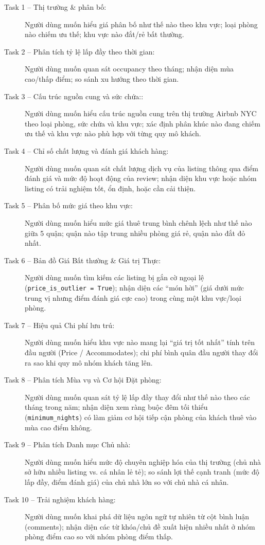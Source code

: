 \begin{description}
    \item[Task 1 -- Thị trường \& phân bố:] Người dùng muốn hiểu giá phân bố như thế nào theo khu vực; loại phòng nào chiếm ưu thế; khu vực nào đắt/rẻ bất thường.

    \item[Task 2 -- Phân tích tỷ lệ lấp đầy theo thời gian:] Người dùng muốn quan sát occupancy theo tháng; nhận diện mùa cao/thấp điểm; so sánh xu hướng theo thời gian.

    \item[Task 3 -- Cấu trúc nguồn cung và sức chứa::] Người dùng muốn hiểu cấu trúc nguồn cung trên thị trường Airbnb NYC theo loại phòng, sức chứa và khu vực; xác định phân khúc nào đang chiếm ưu thế và khu vực nào phù hợp với từng quy mô khách.

    \item[Task 4 -- Chỉ số chất lượng và đánh giá khách hàng:] Người dùng muốn quan sát chất lượng dịch vụ của listing thông qua điểm đánh giá và mức độ hoạt động của review; nhận diện khu vực hoặc nhóm listing có trải nghiệm tốt, ổn định, hoặc cần cải thiện.

    \item[Task 5 -- Phân bố mức giá theo khu vực:] Người dùng muốn hiểu mức giá thuê trung bình chênh lệch như thế nào giữa 5 quận; quận nào tập trung nhiều phòng giá rẻ, quận nào đắt đỏ nhất.

    \item[Task 6 -- Bản đồ Giá Bất thường \& Giá trị Thực:] Người dùng muốn tìm kiếm các listing bị gắn cờ ngoại lệ (\texttt{price\_is\_outlier = True}); nhận diện các ``món hời'' (giá dưới mức trung vị nhưng điểm đánh giá cực cao) trong cùng một khu vực/loại phòng.

    \item[Task 7 -- Hiệu quả Chi phí lưu trú:] Người dùng muốn hiểu khu vực nào mang lại ``giá trị tốt nhất'' tính trên đầu người (Price / Accommodates); chi phí bình quân đầu người thay đổi ra sao khi quy mô nhóm khách tăng lên.

    \item[Task 8 -- Phân tích Mùa vụ và Cơ hội Đặt phòng:] Người dùng muốn quan sát tỷ lệ lấp đầy thay đổi như thế nào theo các tháng trong năm; nhận diện xem ràng buộc đêm tối thiểu (\texttt{minimum\_nights}) có làm giảm cơ hội tiếp cận phòng của khách thuê vào mùa cao điểm không.

    \item[Task 9 -- Phân tích Danh mục Chủ nhà:] Người dùng muốn hiểu mức độ chuyên nghiệp hóa của thị trường (chủ nhà sở hữu nhiều listing vs. cá nhân lẻ tẻ); so sánh lợi thế cạnh tranh (mức độ lấp đầy, điểm đánh giá) của chủ nhà lớn so với chủ nhà cá nhân.

    \item[Task 10 -- Trải nghiệm khách hàng:] Người dùng muốn khai phá dữ liệu ngôn ngữ tự nhiên từ cột bình luận (comments); nhận diện các từ khóa/chủ đề xuất hiện nhiều nhất ở nhóm phòng điểm cao so với nhóm phòng điểm thấp.
\end{description}


